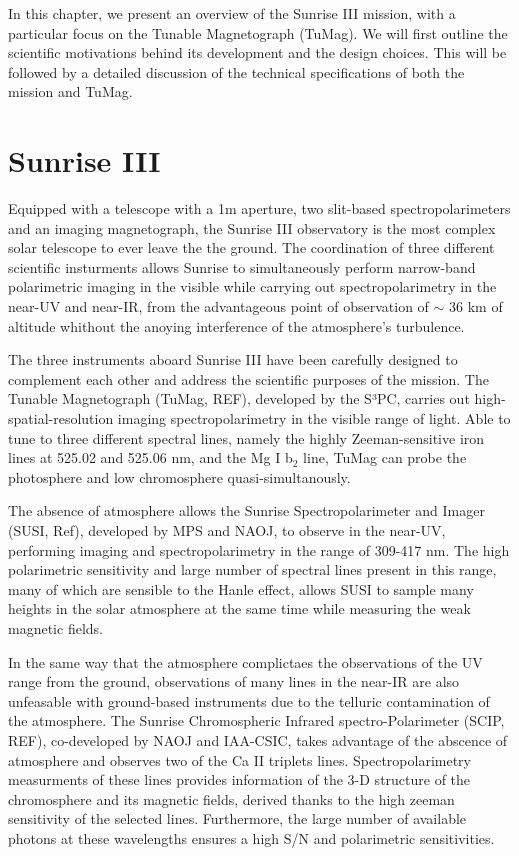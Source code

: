 In this chapter, we present an overview of the Sunrise III mission, with a particular focus on the Tunable Magnetograph (TuMag). We will first outline the scientific motivations behind its development and the design choices. This will be followed by a detailed discussion of the technical specifications of both the mission and TuMag.

\section{Sunrise III}

Equipped with a telescope with a 1m aperture, two slit-based spectropolarimeters and an imaging magnetograph, the Sunrise III observatory is the most complex solar telescope to ever leave the the ground. The coordination of three different scientific insturments allows Sunrise to simultaneously perform narrow-band polarimetric imaging in the visible while carrying out spectropolarimetry in the near-UV and near-IR, from the advantageous point of observation of $\sim$ 36 km of altitude whithout the anoying interference of the atmosphere's turbulence. 

The three instruments aboard Sunrise III have been carefully designed to complement each other and address the scientific purposes of the mission. The Tunable Magnetograph (TuMag, REF), developed by the S³PC, carries out high-spatial-resolution imaging spectropolarimetry in the visible range of light. Able to tune to three different spectral lines, namely the highly Zeeman-sensitive iron lines at 525.02 and 525.06 nm, and the Mg I b$_2$ line, TuMag can probe the photosphere and low chromosphere quasi-simultanously. 

The absence of atmosphere allows the Sunrise Spectropolarimeter and Imager (SUSI, Ref), developed by MPS and NAOJ, to observe in the near-UV, performing imaging and spectropolarimetry in the range of 309-417 nm. The high polarimetric sensitivity and large number of spectral lines present in this range, many of which are sensible to the Hanle effect, allows SUSI to sample many heights in the solar atmosphere at the same time while measuring the weak magnetic fields. 

In the same way that the atmosphere complictaes the observations of the UV range from the ground, observations of many lines in the near-IR are also unfeasable with ground-based instruments due to the telluric contamination of the atmosphere. The Sunrise Chromospheric Infrared spectro-Polarimeter (SCIP, REF), co-developed by NAOJ and IAA-CSIC, takes advantage of the abscence of atmosphere and observes two of the Ca II triplets lines. Spectropolarimetry measurments of these lines provides information of the 3-D structure of the chromosphere and its magnetic fields, derived thanks to the high zeeman sensitivity of the selected lines. Furthermore, the large number of available photons at these wavelengths ensures a high S/N and polarimetric sensitivities. 

